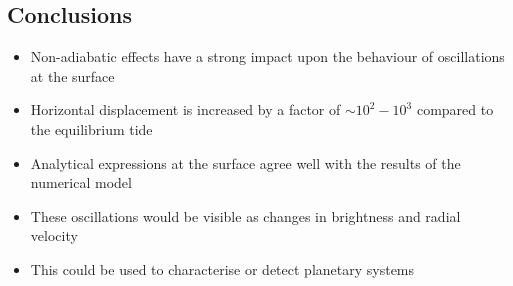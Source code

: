 \documentclass[a0,portrait]{a0poster}
\begin{document}
\begin{multicols}{2}
\begin{tcolorbox}[colframe=black,colback=blue!10!white]
\vspace{0.5cm}

\end{tcolorbox}


\color{Black}

\begin{tcolorbox}[colframe=black,colback=blue!10!white]

\vspace{0.5cm}

\section*{Conclusions}

\large

\begin{itemize}
\item Non-adiabatic effects have a strong impact upon the behaviour of oscillations at the surface
\item Horizontal displacement is increased by a factor of $\sim 10^{2} - 10^{3}$ compared to the equilibrium tide
\item Analytical expressions at the surface agree well with the results of the numerical model
\item These oscillations would be visible as changes in brightness and radial velocity
\item This could be used to characterise or detect planetary systems
\end{itemize}
\vspace{0.5cm}

\normalsize

\end{tcolorbox}

\color{Black} %








\end{multicols}
\end{document}
